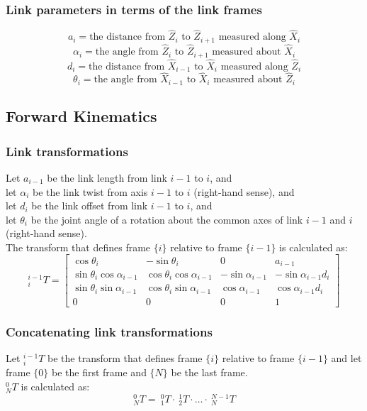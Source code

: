 \documentclass[10pt,a4paper]{article}
\begin{document}
\subsubsection{Link parameters in terms of the link frames}
$$
a_i = \text{the distance from } \hat{Z}_i \text{ to } \hat{Z}_{i+1} \text{ measured along } \hat{X}_i
$$
$$
\alpha_i = \text{the angle from } \hat{Z}_i \text{ to } \hat{Z}_{i+1} \text{ measured about } \hat{X}_i
$$
$$
d_i = \text{the distance from } \hat{X}_{i-1} \text{ to } \hat{X}_i \text{ measured along } \hat{Z}_i
$$
$$
\theta_i = \text{the angle from } \hat{X}_{i-1} \text{ to } \hat{X}_i \text{ measured about } \hat{Z}_i
$$

\subsection{Forward Kinematics}
\subsubsection{Link transformations}
Let $a_{i-1}$ be the link length from link $i-1$ to $i$, and \\
let $\alpha_i$ be the link twist from axis $i-1$ to $i$ (right-hand sense), and \\
let $d_i$ be the link offset from link $i-1$ to $i$, and \\
let $\theta_i$ be the joint angle of a rotation about the common axes of link $i-1$ and $i$ (right-hand sense). \\
The transform that defines frame $\{i\}$ relative to frame $\{i-1\}$ is calculated as: \\
$$
	^{i-1}_iT = \begin{bmatrix}
	\cos \theta_i & -\sin \theta_i & 0 & a_{i-1} \\
	\sin \theta_i \cos \alpha_{i-1} & \cos \theta_i \cos \alpha_{i-1} & -\sin \alpha_{i-1} & -\sin \alpha_{i-1} d_i \\
	\sin \theta_i \sin \alpha_{i-1} & \cos \theta_i \sin \alpha_{i-1} & \cos \alpha_{i-1} & \cos \alpha_{i-1} d_i \\
	0 & 0 & 0 & 1		
	\end{bmatrix}
$$

\subsubsection{Concatenating link transformations}

Let $^{i-1}_iT$ be the transform that defines frame $\{i\}$ relative to frame $\{i-1\}$ and let frame $\{0\}$ be the first frame and $\{N\}$ be the last frame. \\
$^0_NT$ is calculated as:
$$
^0_NT = ~^0_1T ⋅ ~^1_2T ⋅ \dots ⋅ ~^{N-1}_NT
$$
\end{document}
